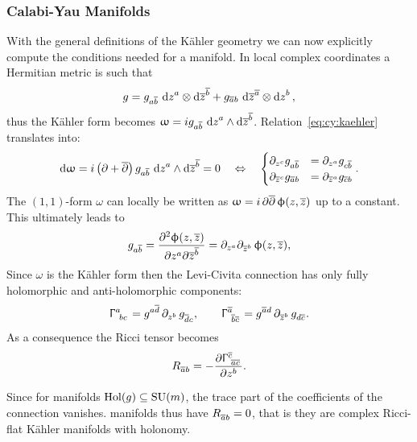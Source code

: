 \subsubsection{Calabi-Yau Manifolds}

With the general definitions of the Kähler geometry we can now explicitly compute the conditions needed for a \cy manifold.
In local complex coordinates a Hermitian metric is such that
\begin{equation}
  g
  =
  g_{a \overline{b}}\, \dd{z}^a \otimes \dd{\ensuremath{\overline{z}}}^{\overline{b}}
  +
  g_{\overline{a} b}\, \dd{\ensuremath{\overline{z}}}^{\overline{a}} \otimes \dd{z}^b,
\end{equation}
thus the Kähler form becomes $\upomega = i g_{a\overline{b}}\, \dd{z}^a \wedge \dd{\ensuremath{\overline{z}}}^{\overline{b}}$.
Relation~\eqref{eq:cy:kaehler} translates into:
\begin{equation}
  \dd{\ensuremath{\upomega}}
  =
  i\, \qty( \partial + \overline{\partial} )\, g_{a\overline{b}}\, \dd{z}^a \wedge \dd{\ensuremath{\overline{z}}}^{\overline{b}}
  =
  0
  \quad
  \Leftrightarrow
  \quad
  \begin{cases}
    \partial_{z^c} g_{a\overline{b}} & = \partial_{z^a} g_{c\overline{b}}
    \\
    \partial_{\overline{z}^c} g_{\overline{a} b} & = \partial_{\overline{z}^a} g_{\overline{c} b}
  \end{cases}.
\end{equation}
The $(1,1)$-form $\omega$ can locally be written as $\upomega = i\, \partial \overline{\partial}\, \upphi( z, \overline{z} )$ up to a constant.
This ultimately leads to
\begin{equation}
  g_{a\barb}
  =
  \pdv{\phi( z, \barz )}{z^a}{\barz^{\barb}}
  =
  \ipd{z^a} \ipd{\barz^b}\, \phi( z, \barz ),
\end{equation}
Since $\omega$ is the Kähler form then the Levi-Civita connection has only fully holomorphic and anti-holomorphic components:
\begin{equation}
  \tensor{\Gamma}{^a_{bc}}
  =
  \tensor{g}{^{a\bard}}\,
  \ipd{z^b}\,
  \tensor{g}{_{\bard c}},
  \qquad
  \tensor{\Gamma}{^{\bara}_{\barb\barc}}
  =
  \tensor{g}{^{\bara d}}\,
  \ipd{\barz^b}\,
  \tensor{g}{_{d\barc}}.
\end{equation}
As a consequence the Ricci tensor becomes
\begin{equation}
  \tensor{R}{_{\bara b}}
  =
  -
  \pdv{\tensor{\Gamma}{^{\barc}_{\bara\barc}}}{z^b}.
\end{equation}

Since for \cy manifolds $\mathrm{Hol}(g) \subseteq \mathrm{SU}(m)$, the trace part of the coefficients of the connection vanishes.
\cy manifolds thus have $\tensor{R}{_{\bara b}} = 0$, that is they are complex Ricci-flat Kähler manifolds with  holonomy.


